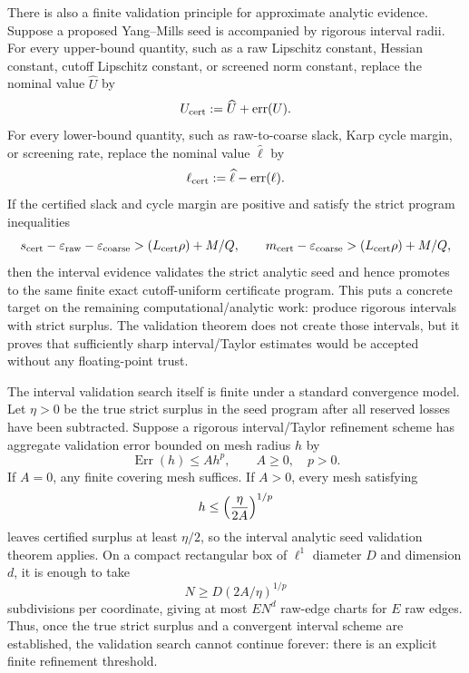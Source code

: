 There is also a finite validation principle for approximate analytic evidence.
Suppose a proposed Yang--Mills seed is accompanied by rigorous interval radii.
For every upper-bound quantity, such as a raw Lipschitz constant, Hessian
constant, cutoff Lipschitz constant, or screened norm constant, replace the
nominal value $\widehat U$ by
\[
  U_{\rm cert}:=\widehat U+\operatorname{err}(U).
\]
For every lower-bound quantity, such as raw-to-coarse slack, Karp cycle margin,
or screening rate, replace the nominal value $\widehat \ell$ by
\[
  \ell_{\rm cert}:=\widehat \ell-\operatorname{err}(\ell).
\]
If the certified slack and cycle margin are positive and satisfy the strict
program inequalities
\[
  s_{\rm cert}-\varepsilon_{\rm raw}-\varepsilon_{\rm coarse}
    >(L_{\rm cert}\rho)+M/Q,
  \qquad
  m_{\rm cert}-\varepsilon_{\rm coarse}
    >(L_{\rm cert}\rho)+M/Q,
\]
then the interval evidence validates the strict analytic seed and hence
promotes to the same finite exact cutoff-uniform certificate program. This
puts a concrete target on the remaining computational/analytic work: produce
rigorous intervals with strict surplus. The validation theorem does not create
those intervals, but it proves that sufficiently sharp interval/Taylor
estimates would be accepted without any floating-point trust.

The interval validation search itself is finite under a standard convergence
model. Let $\eta>0$ be the true strict surplus in the seed program after all
reserved losses have been subtracted. Suppose a rigorous interval/Taylor
refinement scheme has aggregate validation error bounded on mesh radius $h$ by
\[
  \operatorname{Err}(h)\leq A h^p,\qquad A\geq 0,\quad p>0 .
\]
If $A=0$, any finite covering mesh suffices. If $A>0$, every mesh satisfying
\[
  h\leq \left({\eta\over 2A}\right)^{1/p}
\]
leaves certified surplus at least $\eta/2$, so the interval analytic seed
validation theorem applies. On a compact rectangular box of $\ell^1$ diameter
$D$ and dimension $d$, it is enough to take
\[
  N\geq D(2A/\eta)^{1/p}
\]
subdivisions per coordinate, giving at most $E N^d$ raw-edge charts for $E$
raw edges. Thus, once the true strict surplus and a convergent interval scheme
are established, the validation search cannot continue forever: there is an
explicit finite refinement threshold.

